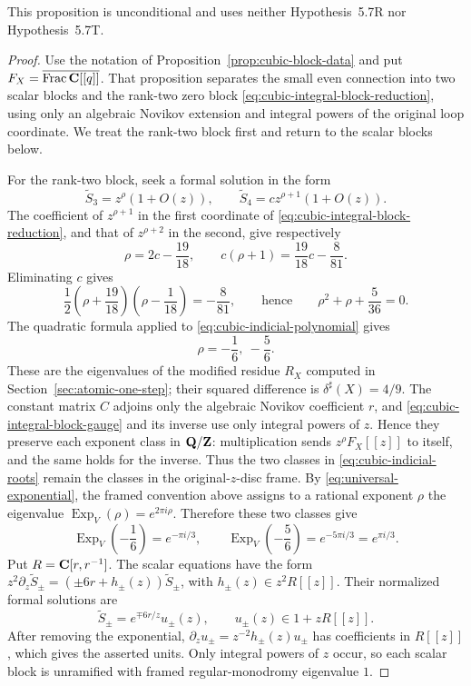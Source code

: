 This proposition is unconditional and uses neither Hypothesis~5.7R nor
Hypothesis~5.7T.

\begin{proof}
Use the notation of Proposition~\ref{prop:cubic-block-data} and put
\(F_X=\overline{\operatorname{Frac}\mathbf C[[q]]}\).  That
proposition separates the small even connection into two scalar blocks and
the rank-two zero block \eqref{eq:cubic-integral-block-reduction}, using
only an algebraic Novikov extension and integral powers of the original
loop coordinate.  We treat the rank-two block first and return to the scalar
blocks below.

For the rank-two block, seek a formal solution in the form
\[
 \widetilde S_3=z^\rho(1+O(z)),
 \qquad
 \widetilde S_4=cz^{\rho+1}(1+O(z)).
 \label{eq:cubic-indicial-ansatz}
\]
The coefficient of \(z^{\rho+1}\) in the first coordinate of
\eqref{eq:cubic-integral-block-reduction}, and that of \(z^{\rho+2}\) in
the second, give respectively
\[
 \rho=2c-\frac{19}{18},
 \qquad
 c(\rho+1)=\frac{19}{18}c-\frac8{81}.
 \label{eq:cubic-indicial-coefficients}
\]
Eliminating \(c\) gives
\[
 \frac12\left(\rho+\frac{19}{18}\right)
 \left(\rho-\frac1{18}\right)=-\frac8{81},
 \qquad\text{hence}\qquad
 \rho^2+\rho+\frac5{36}=0.
 \label{eq:cubic-indicial-polynomial}
\]
The quadratic formula applied to \eqref{eq:cubic-indicial-polynomial} gives
\[
 \rho=-\frac16,\ -\frac56.
 \label{eq:cubic-indicial-roots}
\]
These are the eigenvalues of the modified residue \(R_X\) computed in
Section~\ref{sec:atomic-one-step}; their squared difference is
\(\delta^\sharp(X)=4/9\).
The constant matrix \(C\) adjoins only the algebraic Novikov coefficient
\(r\), and \eqref{eq:cubic-integral-block-gauge} and its inverse use only
integral powers of \(z\).  Hence they preserve each exponent class in
\(\mathbf Q/\mathbf Z\): multiplication sends \(z^\rho F_X[[z]]\) to itself, and the same
holds for the inverse.  Thus the two classes in
\eqref{eq:cubic-indicial-roots} remain the classes in the original-\(z\)-disc
frame.  By \eqref{eq:universal-exponential}, the framed convention above
assigns to a rational exponent \(\rho\) the eigenvalue
\(\operatorname{Exp}_V(\rho)=e^{2\pi i\rho}\).  Therefore these two classes
give
\[
 \operatorname{Exp}_V\left(-\frac16\right)=e^{-\pi i/3},
 \qquad
 \operatorname{Exp}_V\left(-\frac56\right)
 =e^{-5\pi i/3}=e^{\pi i/3}.
 \label{eq:cubic-framed-eigenvalues}
\]
Put \(R=\mathbf C[r,r^{-1}]\).  The scalar equations have the form
\(z^2\partial_z\widetilde S_\pm=(\pm6r+h_\pm(z))\widetilde S_\pm\), with
\(h_\pm(z)\in z^2R[[z]]\).  Their normalized formal solutions are
\[
 \widetilde S_\pm=e^{\mp6r/z}u_\pm(z),
 \qquad u_\pm(z)\in1+zR[[z]].
 \label{eq:cubic-rank-one-solutions}
\]
After removing the exponential,
\(\partial_zu_\pm=z^{-2}h_\pm(z)u_\pm\) has coefficients in \(R[[z]]\),
which gives the asserted units.  Only integral powers of \(z\) occur, so each
scalar block is unramified with framed regular-monodromy eigenvalue \(1\).


\end{proof}
